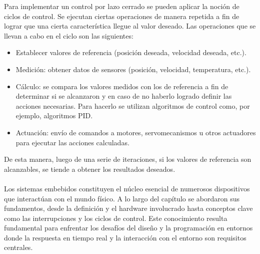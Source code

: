 Para implementar un control por lazo cerrado se pueden aplicar la noción de ciclos de control. Se ejecutan ciertas operaciones de manera repetida a fin de lograr que una cierta característica llegue al valor deseado. Las operaciones que se llevan a cabo en el ciclo son las siguientes:

\begin{itemize}
\item Establecer valores de referencia (posición deseada, velocidad deseada, etc.).
\item Medición: obtener datos de sensores (posición, velocidad, temperatura, etc.).
\item Cálculo: se compara los valores medidos con los de referencia a fin de determinar si se alcanzaron y en caso de no haberlo logrado definir las acciones necesarias. Para hacerlo se utilizan algoritmos de control como, por ejemplo, algoritmos \gls{PID}.
\item Actuación: envío de comandos a motores, \gls{servomecanismos} u otros actuadores para ejecutar las acciones calculadas.
\end{itemize}

De esta manera, luego de una serie de iteraciones, si los valores de referencia son alcanzables, se tiende a obtener los resultados deseados.
\\\\


Los sistemas embebidos constituyen el núcleo esencial de numerosos dispositivos que interactúan con el mundo físico. A lo largo del capítulo se abordaron sus fundamentos, desde la definición y el hardware involucrado hasta conceptos clave como las interrupciones y los ciclos de control. Este conocimiento resulta fundamental para enfrentar los desafíos del diseño y la programación en entornos donde la respuesta en tiempo real y la interacción con el entorno son requisitos centrales.
